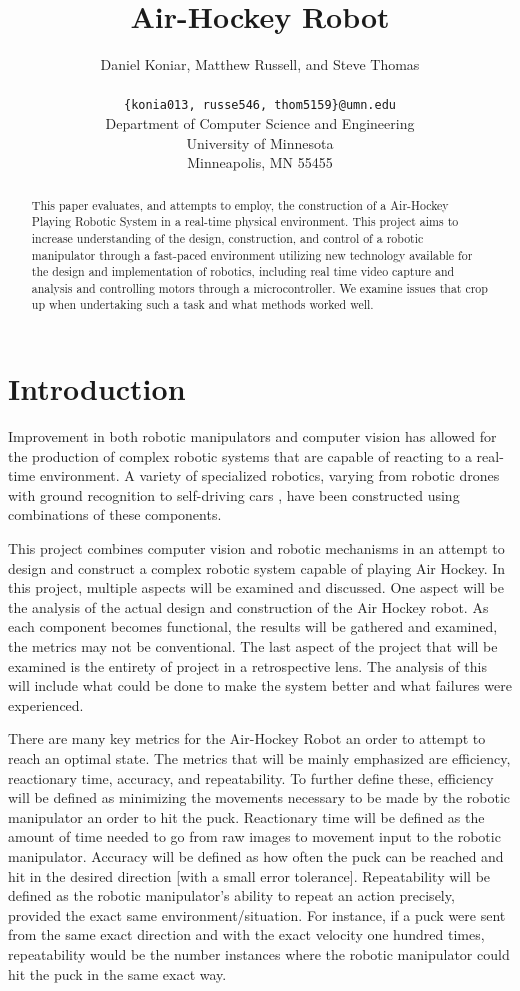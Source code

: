 \documentclass[letterpaper, 12 pt, conference]{ieeeconf}
\title{\bf
Air-Hockey Robot
}
\author{\parbox{5 in}{\centering Daniel Koniar, Matthew Russell, and Steve Thomas}\\
  {\tt\small \{konia013, russe546, thom5159\}@umn.edu}\\
  Department of Computer Science and Engineering\\
  University of Minnesota\\
  Minneapolis, MN 55455\\
}
\begin{document}
\maketitle
\thispagestyle{empty}
\pagestyle{empty}

\begin{abstract}
This paper evaluates, and attempts to employ, the construction of a Air-Hockey Playing Robotic System in a real-time physical environment.  This project aims to increase understanding of the design, construction, and control of a robotic manipulator through a fast-paced environment utilizing new technology available for the design and implementation of robotics, including real time video capture and analysis and controlling motors through a microcontroller. We examine issues that crop up when undertaking such a task and what methods worked well.
\end{abstract}

\section{Introduction}
\label{introduction}
Improvement in both robotic manipulators and computer vision has allowed for the production of complex robotic systems that are capable of reacting to a real-time environment. A variety of specialized robotics, varying from robotic drones \cite{3dr} with ground recognition to self-driving cars \cite{googlecar}, have been constructed using combinations of these components.  

This project combines computer vision and robotic mechanisms in an attempt to design and construct a complex robotic system capable of playing Air Hockey. In this project, multiple aspects will be examined and discussed.  One aspect will be the analysis of the actual design and construction of the Air Hockey robot.  As each component becomes functional, the results will be gathered and examined, the metrics may not be conventional. The last aspect of the project that will be examined is the entirety of project in a retrospective lens.  The analysis of this will include what could be done to make the system better and what failures were experienced.

There are many key metrics for the Air-Hockey Robot an order to attempt to reach an optimal state. The metrics that will be mainly emphasized are efficiency, reactionary time, accuracy, and repeatability. To further define these, efficiency will be defined as minimizing the movements necessary to be made by the robotic manipulator an order to hit the puck.  Reactionary time will be defined as the amount of time needed to go from raw images to movement input to the robotic manipulator. Accuracy will be defined as how often the puck can be reached and hit in the desired direction [with a small error tolerance].  Repeatability will be defined as the robotic manipulator’s ability to repeat an action precisely, provided the exact same environment/situation. For instance, if a puck were sent from the same exact direction and with the exact velocity one hundred times, repeatability would be the number instances where the robotic manipulator could hit the puck in the same exact way.
\end{document}
